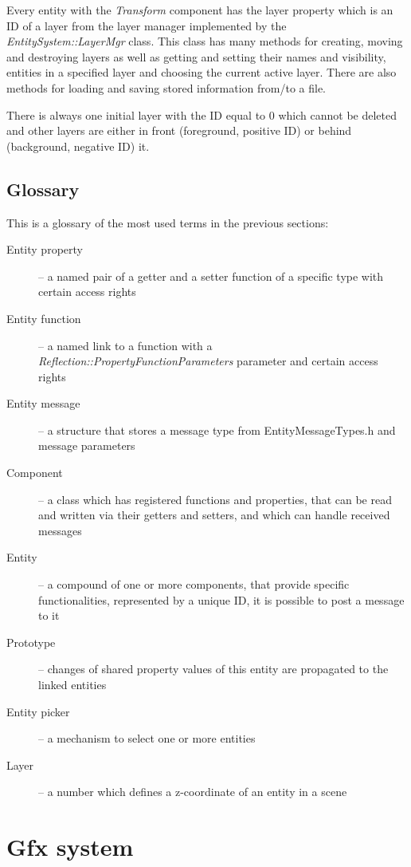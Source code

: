 \documentclass[a4paper, 12pt]{report}
\begin{document}
Every entity with the \emph{Transform} component has the layer property which is an ID of a layer from the layer manager implemented by the \emph{EntitySystem::LayerMgr} class. This class has many methods for creating, moving and destroying layers as well as getting and setting their names and visibility, entities in a specified layer and choosing the current active layer. There are also methods for loading and saving stored information from/to a file.

There is always one initial layer with the ID equal to 0 which cannot be deleted and other layers are either in front (foreground, positive ID) or behind (background, negative ID) it.

\section{Glossary}

This is a glossary of the most used terms in the previous sections:

\begin{description}
  \item[Entity property] -- a named pair of a getter and a setter function of a specific type with certain access rights
  \item[Entity function] -- a named link to a function with a \emph{Reflection::Property\-FunctionParameters} parameter and certain access rights
  \item[Entity message] -- a structure that stores a message type from EntityMessageTypes.h and message parameters
  \item[Component] -- a class which has registered functions and properties, that can be read and written via their getters and setters, and which can handle received messages
  \item[Entity] -- a compound of one or more components, that provide specific functionalities, represented by a unique ID, it is possible to post a message to it
  \item[Prototype] -- changes of shared property values of this entity are propagated to the linked entities
  \item[Entity picker] -- a mechanism to select one or more entities
  \item[Layer] -- a number which defines a z-coordinate of an entity in a scene
\end{description}



\chapter{Gfx system}
\end{document}
